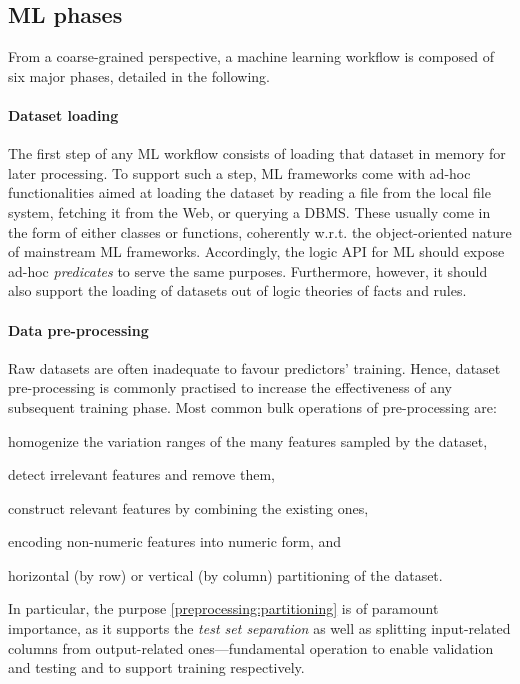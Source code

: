 \documentclass[
]{ceurart}
\begin{document}
\subsection{ML phases}
\label{ssec:ml-phases}

From a coarse-grained perspective, a machine learning workflow is composed of six major phases, detailed in the following.

\paragraph{Dataset loading}
%
The first step of any ML workflow consists of loading that dataset in memory for later processing.
%
To support such a step, ML frameworks come with ad-hoc functionalities aimed at loading the dataset by reading a file from the local file system, fetching it from the Web, or querying a DBMS.
%
These usually come in the form of either classes or functions, coherently w.r.t. the object-oriented nature of mainstream ML frameworks.
%
Accordingly, the logic API for ML should expose ad-hoc \emph{predicates} to serve the same purposes.
%
Furthermore, however, it should also support the loading of datasets out of logic theories of facts and rules.

\paragraph{Data pre-processing}
%
Raw datasets are often inadequate to favour predictors' training.
%
Hence, dataset pre-processing is commonly practised to increase the effectiveness of any subsequent training phase.
%
Most common bulk operations of pre-processing are:
%
\begin{inlinelist}
    \item homogenize the variation ranges of the many features sampled by the dataset,
    \item detect irrelevant features and remove them,
    \item construct relevant features by combining the existing ones,
    \item encoding non-numeric features into numeric form, and
    \item\label{preprocessing:partitioning} horizontal (by row) or vertical (by column) partitioning of the dataset.
\end{inlinelist}
%
In particular, the purpose \ref{preprocessing:partitioning} is of paramount importance, as it supports the \emph{test set separation} as well as splitting input-related columns from output-related ones---fundamental operation to enable validation and testing and to support training respectively.
\end{document}
